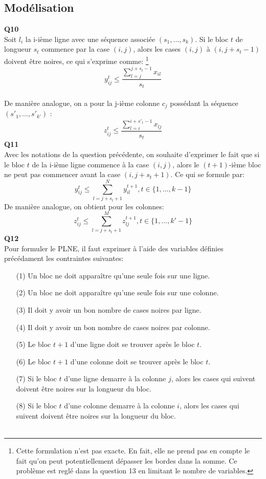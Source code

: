 \documentclass[10pt,a4paper]{article}
\begin{document}
\subsection{Modélisation}
\noindent
\textbf{Q10} \\
\noindent
Soit $l_i$ la i-ième ligne avec une séquence associée $(s_1, \hdots ,s_k)$. Si le bloc $t$ de longueur $s_t$ commence par la case $(i,j)$, alors les cases $(i,j)$ à $(i,j+s_t-1)$ doivent être noires, ce qui s'exprime comme: \footnote{Cette formulation n'est pas exacte. En fait, elle ne prend pas en compte le fait qu'on peut potentiellement dépasser les bordes dans la somme. Ce problème est reglé dans la question 13 en limitant le nombre de variables.} 
 $$ y_{ij}^{t} \leq \frac{\sum_{l = j}^{j+s_t-1} x_{il}}{s_t}$$\\ 
\noindent
De manière analogue, on a pour la j-ième colonne $c_j$ possédant la séquence $(s'_{1}, \hdots , s'_{k'})$ : 
$$ z_{ij}^{t} \leq \frac{\sum_{l = i}^{i+s'_t-1} x_{lj}}{s_t}$$
\textbf{Q11} \\
Avec les notations de la question précédente, on souhaite d'exprimer le fait que si le bloc $t$ de la i-ième ligne commence à la case $(i,j)$, alors le $(t+1)$-ième bloc ne peut pas commencer avant la case $(i, j+ s_t +1)$. Ce qui se formule par: 
$$ y_{ij}^t \leq \sum_{l = j+s_t+1}^N y_{il}^{t+1} , t \in \lbrace 1, \hdots, k-1 \rbrace$$
\noindent
De manière analogue, on obtient pour les colonnes: 
$$ z_{ij}^t \leq \sum_{l = j+s_t+1}^M z_{lj}^{t+1} , t \in \lbrace 1, \hdots, k'-1 \rbrace$$
\textbf{Q12} \\ 
\noindent
Pour formuler le PLNE, il faut exprimer à l'aide des variables définies précédament les contraintes suivantes: \\
\begin{itemize}
\item[(1)] Un bloc ne doit apparaître qu'une seule fois sur une ligne.
\item[(2)] Un bloc ne doit apparaître qu'une seule fois sur une colonne.
\item[(3)] Il doit y avoir un bon nombre de cases noires par ligne.
\item[(4)] Il doit y avoir un bon nombre de cases noires par colonne.
\item[(5)] Le bloc $t+1$ d'une ligne doit se trouver après le bloc $t$.
\item[(6)] Le bloc $t+1$ d'une colonne doit se trouver après le bloc $t$.
\item[(7)] Si le bloc $t$ d'une ligne demarre à la colonne $j$, alors les cases qui suivent doivent être noires sur la longueur du bloc.
\item[(8)] Si le bloc $t$ d'une colonne demarre à la colonne $i$, alors les cases qui suivent doivent être noires sur la longueur du bloc. \\ \\    
\end{itemize} 
\end{document}
